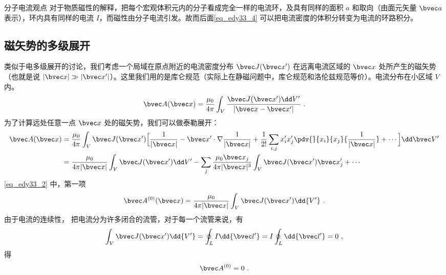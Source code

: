 
\begin{lemma}{分子电流观点}
对于物质磁性的解释，把每个宏观体积元内的分子看成完全一样的电流环，及具有同样的面积 $a$ 和取向（由面元矢量 $\bvec a$ 表示），环内具有同样的电流 $I$，而磁性由分子电流引发。故而后面\autoref{eq_edy33_4} 可以把电流密度的体积分转变为电流的环路积分。
\end{lemma}
\subsection{磁矢势的多级展开}
类似于电多级展开的讨论，我们考虑一个局域在原点附近的电流密度分布 $\bvec J(\bvec x')$ 在远离电流区域的 $\bvec x$ 处所产生的磁矢势（也就是说 $|\bvec x|\gg|\bvec x'|$）。这里我们用的是库仑规范（实际上在静磁问题中，库仑规范和洛伦兹规范等价）。电流分布在小区域 $V$ 内。
\begin{equation}
\bvec A(\bvec x)=\dfrac {\mu_0}{4\pi} \int_V \dfrac{ \bvec J(\bvec x^{\prime})\dd V^{\prime}}{|\bvec x - \bvec x'|}\label{eq_edy33_1}~.
\end{equation}
为了计算远处任意一点 $\bvec x$ 处的磁矢势，我们可以做泰勒展开：
\begin{equation}\label{eq_edy33_2}
\begin{aligned}
\bvec A(\bvec x)&=\dfrac {\mu_0}{4\pi}\int_V \bvec J(\bvec x')\Big[\dfrac{1}{|\bvec x|}-\bvec x'\cdot\nabla \dfrac{1}{|\bvec x|}+\dfrac{1}{2!}\sum_{i,j}x_i^{\prime}x_j^{\prime}\pdv{}{x_i}{x_j}{\dfrac 1 {|\bvec x|}}+\cdots\Big]\dd \bvec V^{\prime}
\\
&=\dfrac{\mu_0}{4\pi|\bvec x|}\int_V \bvec J(\bvec x')\dd V'
-\sum_{j}\dfrac{\mu_0 \bvec x_j}{4\pi |\bvec x|^3}\int_V \bvec J(\bvec x')\bvec x'_j + \cdots
\end{aligned}
\end{equation}
\autoref{eq_edy33_2} 中，第一项
\begin{equation}
\bvec A^{(0)}(\bvec x)=\dfrac {\mu_0}{4\pi |\bvec x|}\int_V \bvec J(\bvec x')\dd{ V^{\prime}}\label{eq_edy33_3}~.
\end{equation}
由于电流的连续性，%
把电流分为许多闭合的流管，对于每一个流管来说，有
\begin{equation}
\int_V \bvec J(\bvec x^{\prime}) \dd{V^{\prime}}=\oint_L I\dd{\bvec l'}=I\oint_L \dd{\bvec l'}=0\label{eq_edy33_4}~,
\end{equation}
得\begin{equation}
\bvec A^{(0)}=0\label{eq_edy33_5}~.
\end{equation}

